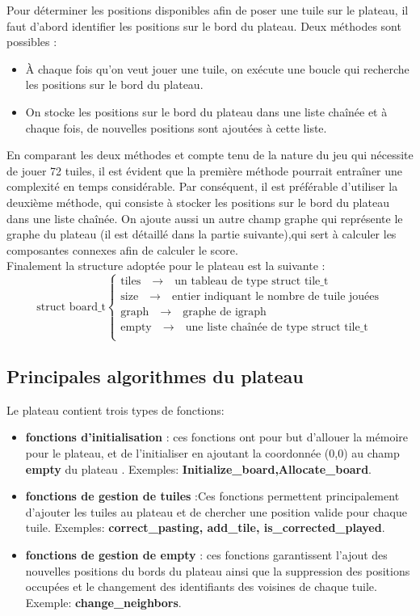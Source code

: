 \documentclass[10pt]{article}
\begin{document}
Pour déterminer les positions disponibles afin de poser une tuile sur le plateau, il faut d'abord identifier les positions sur le bord du plateau. Deux méthodes sont possibles :
\begin{itemize}
    \item À chaque fois qu'on veut jouer une tuile, on exécute une boucle qui recherche les positions sur le bord du plateau.
    \item On stocke les positions sur le bord du plateau dans une liste chaînée et à chaque fois, de nouvelles positions sont ajoutées à cette liste. 
\end{itemize}
En comparant les deux méthodes et compte tenu de la nature du jeu qui nécessite de jouer 72 tuiles, il est évident que la première méthode pourrait entraîner une complexité en temps considérable. Par conséquent, il est préférable d'utiliser la deuxième méthode, qui consiste à stocker les positions sur le bord du plateau dans une liste chaînée. 
On ajoute aussi  un autre champ graphe qui représente le graphe du plateau (il est détaillé dans la partie suivante),qui sert à calculer les composantes connexes afin de calculer le score.\\

Finalement la structure adoptée pour le plateau est la suivante :
\[
\text{struct board\_t} \left\{
\begin{array}{l}
\text{tiles} \quad \rightarrow \quad \text{un tableau de type struct tile\_t }\\
\text{size} \quad \rightarrow \quad \text{entier indiquant le nombre de tuile jouées}\\
\text{graph} \quad \rightarrow \quad \text{graphe de igraph }\\
\text{empty} \quad \rightarrow \quad \text{une liste chaînée de type struct tile\_t  }\\
\end{array}
\right.
\]
\subsection{Principales algorithmes du plateau}
Le plateau contient trois types de  fonctions:
\begin{itemize}
    \item \textbf{fonctions d'initialisation} : ces fonctions ont pour but d'allouer la mémoire pour le plateau, et de l'initialiser en ajoutant la coordonnée (0,0) au champ \textbf{empty} du plateau . Exemples: \textbf{Initialize\_board,Allocate\_board}.
    \item \textbf{fonctions de gestion de tuiles} :Ces fonctions permettent principalement d'ajouter les tuiles au plateau et de chercher une position valide pour chaque tuile. Exemples: \textbf{correct\_pasting, add\_tile, is\_corrected\_played}.
    \item \textbf{fonctions de gestion de empty} : ces fonctions garantissent l'ajout des nouvelles positions du bords du plateau ainsi que la suppression des positions occupées et le changement des identifiants des voisines de chaque tuile. Exemple:\textbf{ change\_neighbors}.
\end{itemize}
\end{document}
